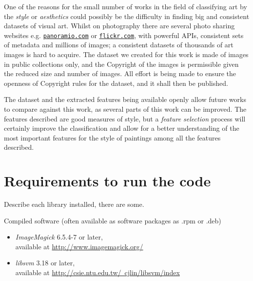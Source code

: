 \documentclass[11pt,a4paper,twoside,openright]{report}
\renewcommand{\bibname}{References}
\begin{document}
One of the reasons for the small number of works in the field of classifying
art by the \emph{style} or \emph{aesthetics} could possibly be the difficulty
in finding big and consistent datasets of visual art.  Whilst on photography
there are several photo sharing websites e.g.
\href{http://panoramio.com}{\texttt{panoramio.com}} or
\href{http://flickr.com}{\texttt{flickr.com}}, with powerful APIs, consistent
sets of metadata and millions of images;  a consistent datasets of thousands of
art images is hard to acquire.  The dataset we created for this work is made of
images in public collections only, and the Copyright of the images is
permissible given the reduced size and number of images.  All effort is being
made to ensure the openness of Copyright rules for the dataset, and it shall
then be published.

The dataset and the extracted features being available openly allow future
works to compare against this work, as several parts of this work can be
improved.  The features described are good measures of style, but a
\emph{feature selection} process will certainly improve the classification and
allow for a better understanding of the most important features for the style
of paintings among all the features described.


\newpage
{}
\addcontentsline{toc}{chapter}{\bibname}



\appendix

\chapter{Requirements to run the code}
\label{chap:requirements}

Describe each library installed, there are some.

Compiled software (often available as software packages as .rpm or .deb)
\begin{itemize}
\item[]\emph{ImageMagick} 6.5.4-7 or later, \\
available at \href{http://www.imagemagick.org/}{http://www.imagemagick.org/}

\item[]\emph{libsvm} 3.18 or later, \\
available at \href{http://csie.ntu.edu.tw/~cjlin/libsvm/index}
{http://csie.ntu.edu.tw/~cjlin/libsvm/index}
\end{itemize}
\end{document}
